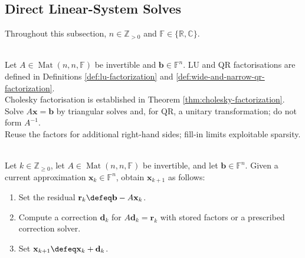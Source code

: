 \subsection{Direct Linear-System Solves}

Throughout this subsection, $n\in\mathbb{Z}_{>0}$ and $\mathbb{F}\in\{\mathbb{R},\mathbb{C}\}$.

\begin{perspective} \label{per:solve-with-factors-not-inverses} \\
Let $A\in\operatorname{Mat}(n,n,\mathbb{F})$ be invertible and $\mathbf{b}\in\mathbb{F}^n$. LU and QR factorisations are defined in Definitions \ref{def:lu-factorization} and \ref{def:wide-and-narrow-qr-factorization}.\\
Cholesky factorisation is established in Theorem \ref{thm:cholesky-factorization}.\\
Solve $A\mathbf{x}=\mathbf{b}$ by triangular solves and, for QR, a unitary transformation; do not form $A^{-1}$.\\
Reuse the factors for additional right-hand sides; fill-in limits exploitable sparsity.
\end{perspective}

\begin{computationmethod} \label{meth:iterative-refinement-residual-correction} \\
Let $k\in\mathbb{Z}_{\geq0}$, let $A\in\operatorname{Mat}(n,n,\mathbb{F})$ be invertible, and let $\mathbf{b}\in\mathbb{F}^n$. Given a current approximation $\mathbf{x}_k\in\mathbb{F}^n$, obtain $\mathbf{x}_{k+1}$ as follows:
\begin{enumerate}[label=(\roman*)]
\setlength{\itemsep}{0pt}
\item Set the residual $\mathbf{r}_k\defeq\mathbf{b}-A\mathbf{x}_k$.
\item Compute a correction $\mathbf{d}_k$ for $A\mathbf{d}_k=\mathbf{r}_k$ with stored factors or a prescribed correction solver.
\item Set $\mathbf{x}_{k+1}\defeq\mathbf{x}_k+\mathbf{d}_k$.
\end{enumerate}
\end{computationmethod}

